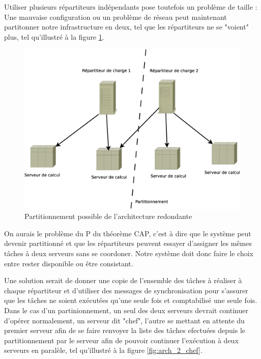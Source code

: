 
Utiliser plusieurs répartiteurs indépendants pose toutefois un problème de taille : Une mauvaise configuration ou un problème 
de réseau peut maintenant partitonner notre infrastructure en deux, tel que les répartiteurs ne se "voient" plus, tel qu'illustré à la figure \ref{fig:arch_part}.

\begin{figure}
  \includegraphics[width=\linewidth]{Arch_2_part.eps}
  \caption{Partitionnement possible de l'architecture redondante}
  \label{fig:arch_part}
\end{figure}

On aurais le problème du P du théorème CAP, c'est à dire que le système peut devenir partitionné et que les répartiteurs 
peuvent essayer d'assigner les mêmes tâches à deux serveurs sans se coordoner. Notre système doit donc faire le choix entre rester
disponible ou être consistant. 

Une solution serait de donner une copie de l'ensemble des tâches à réaliser à chaque répartiteur et d'utiliser des messages de synchronisation pour s'assurer que les 
tâches ne soient exécutées qu'une seule fois et comptabilisé une seule fois. Dans le cas d'un partinionnement, un seul des deux serveurs devrait continuer d'opérer normalement, 
un serveur dit "chef", l'autre se mettant en attente du premier serveur afin de se faire renvoyer la liste des tâches efectuées depuis le partitionnement par le serveur 
afin de pouvoir continuer l'exécution à deux serveurs en paralèle, tel qu'illustré à la figure \ref{fig:arch_2_chef}.

